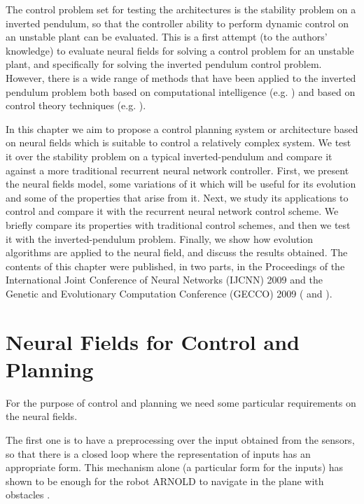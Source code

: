 The control problem set for testing the architectures is the stability
problem on a inverted pendulum, so that the controller ability to
perform dynamic control on an unstable plant can be evaluated. This is
a first attempt (to the authors' knowledge) to evaluate neural fields
for solving a control problem for an unstable plant, and specifically
for solving the inverted pendulum control problem. However, there is a
wide range of methods that have been applied to the inverted pendulum
problem both based on computational intelligence
(e.g. \cite{Anderson89Learning, Bardossy95Fuzzy, Moriarty96Efficient,
  Zhang02recurrent}) and based on control theory techniques
(e.g. \cite{Kajiwara99LPV, Huang00Control, Chang02self-tuning}).

In this chapter we aim to propose a control planning system or
architecture based on neural fields which is suitable to control a
relatively complex system. We test it over the stability problem on a
typical inverted-pendulum and compare it against a more traditional
recurrent neural network controller. First, we present the neural
fields model, some variations of it which will be useful for its
evolution and some of the properties that arise from it. Next, we
study its applications to control and compare it with the recurrent
neural network control scheme. We briefly compare its properties with
traditional control schemes, and then we test it with the
inverted-pendulum problem. Finally, we show how evolution algorithms
are applied to the neural field, and discuss the results obtained. The
contents of this chapter were published, in two parts, in the
Proceedings of the International Joint Conference of Neural Networks
(IJCNN) 2009 and the Genetic and Evolutionary Computation Conference
(GECCO) 2009 (\cite{Figueredo09Applying} and \cite{Figueredo09Evolved}).


\section{Neural Fields for Control and Planning}
For the purpose of control and planning we need some particular
requirements on the neural fields.

The first one is to have a preprocessing over the input
obtained from the sensors, so that there is a closed loop where the
representation of inputs has an appropriate form. This mechanism alone
(a particular form for the inputs) has shown to be enough for the robot
ARNOLD to navigate in the plane with obstacles
\cite{Bergener99Complex}.

